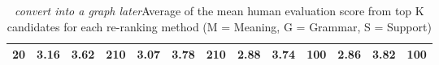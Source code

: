\documentclass[11pt]{article}
\begin{document}
\begin{table}
\begin{center}
\begin{tabular}{rcccccccccccc}
{\scriptsize 20} & {\scriptsize 3.16} & {\scriptsize 3.62} & {\scriptsize 210} & {\scriptsize 3.07} & {\scriptsize 3.78} & {\scriptsize 210} & {\scriptsize 2.88} & {\scriptsize 3.74} & {\scriptsize 100} & {\scriptsize 2.86} & {\scriptsize 3.82} & {\scriptsize 100}  \\
\hline
\end{tabular}
\end{center}
\caption{\emph{convert into a graph later}Average of the mean human evaluation score from top K candidates for each re-ranking method (M = Meaning, G = Grammar,  S = Support) }
\label{table11}
\end{table}
\end{document}
